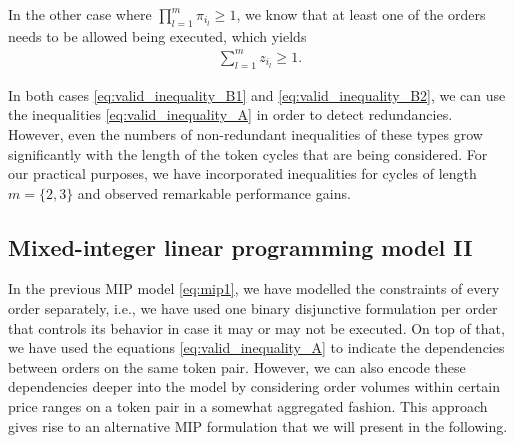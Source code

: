 \documentclass[11pt,parskip=full]{scrartcl}%
\newcommand*{\ie}{i.e., }
\begin{document}
In the other case where $\prod_{l=1}^m \pi_{i_l} \ge 1$, we know that at least one of the orders
needs to be allowed being executed, which yields
\begin{align}
  \sum\limits_{l=1}^m z_{i_l} \ge 1.
  \label{eq:valid_inequality_B2}
\end{align}

In both cases \eqref{eq:valid_inequality_B1} and \eqref{eq:valid_inequality_B2}, we can use the
inequalities \eqref{eq:valid_inequality_A} in order to detect redundancies.
However, even the numbers of non-redundant inequalities of these types grow significantly with the
length of the token cycles that are being considered.
For our practical purposes, we have incorporated inequalities for cycles of length $ m=\{2,3\} $
and observed remarkable performance gains.




\newpage
\subsection{Mixed-integer linear programming model II}
\label{subsec:MIP2}

In the previous MIP model \eqref{eq:mip1}, we have modelled the constraints of every order
separately, \ie we have used one binary disjunctive formulation per order that controls its
behavior in case it may or may not be executed.
On top of that, we have used the equations \eqref{eq:valid_inequality_A} to indicate the
dependencies between orders on the same token pair.
However, we can also encode these dependencies deeper into the model by considering order volumes
within certain price ranges on a token pair in a somewhat aggregated fashion.
This approach gives rise to an alternative MIP formulation that we will present in the following.
\end{document}
